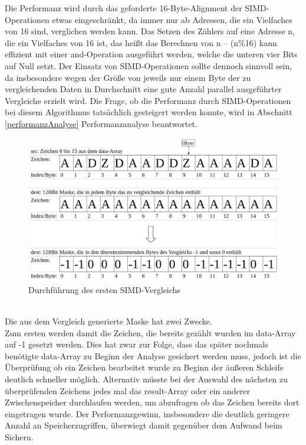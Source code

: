 \documentclass[course=erap]{aspdoc}
\begin{document}
Die Performanz wird durch das geforderte 16-Byte-Alignment der SIMD-Operationen etwas eingeschränkt, da immer nur ab Adressen, die ein Vielfaches von 16 sind, verglichen werden kann. Das Setzen des Zählers auf eine Adresse n, die ein Vielfaches von 16 ist, das heißt das Berechnen von  n – (n\%16) kann effizient mit einer and-Operation ausgeführt werden, welche die unteren vier Bits auf Null setzt. Der Einsatz von SIMD-Operationen sollte dennoch sinnvoll sein, da insbesondere wegen der Größe von jeweils nur einem Byte der zu vergleichenden Daten in Durchschnitt eine gute Anzahl parallel ausgeführter Vergleiche erzielt wird. Die Frage, ob die Performanz durch SIMD-Operationen bei diesem Algorithmus tatsächlich gesteigert werden konnte, wird in Abschnitt \ref{performanzAnalyse} Performanzanalyse beantwortet.\\
\begin{figure}[h]
\begin{center}
\includegraphics[scale=0.3]{resourcen/abb1.png}
\caption{Durchführung des ersten SIMD-Vergleichs}
\label{abb2}
\end{center}
\end{figure}
\\
Die aus dem Vergleich generierte Maske hat zwei Zwecke.\\
Zum ersten werden damit die Zeichen, die bereits gezählt wurden im data-Array auf -1 gesetzt werden. Dies hat zwar zur Folge, dass das später nochmals benötigte data-Array zu Beginn der Analyse gesichert werden muss, jedoch ist die Überprüfung ob ein Zeichen bearbeitet wurde zu Beginn der äußeren Schleife deutlich schneller möglich. Alternativ müsste bei der Auswahl des nächsten zu überprüfenden Zeichens jedes mal das result-Array oder ein anderer Zwischenspeicher durchlaufen werden, um abzufragen ob das Zeichen bereits dort eingetragen wurde. Der Performanzgewinn, insbesondere die deutlich geringere Anzahl an Speicherzugriffen, überwiegt damit gegenüber dem Aufwand beim Sichern.\\
\end{document}
